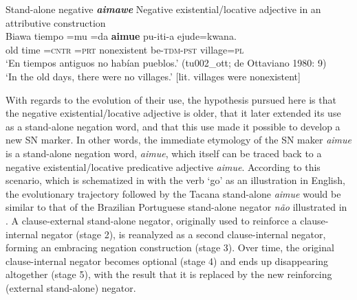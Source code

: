 \documentclass[output=paper]{langsci/langscibook}
\begin{document}
\begin{exe}\ex
\label{ex:tacana-standalone-negative}  Stand-alone negative
\textbf{\textit{aimawe}}
%
\ex\label{ex:tacana-negexadj} Negative existential\slash locative adjective
in an attributive construction\\
\gll {\ob}Biawa tiempo{\cb} =mu =da \textbf{aimue} pu-iti-a ejude=kwana.\\
    old  time  =\textsc{cntr}  \textsc{=prt}  nonexistent
    be-\textsc{tdm-pst}  village=\textsc{pl}\\
\glt `En tiempos antiguos no habían pueblos.' (tu002\_ott; de Ottaviano 1980: 9)\\
`In the old days, there were no villages.' [lit. villages were nonexistent]
\end{exe}

With regards to the evolution of their use, the hypothesis pursued
here is that the negative existential\slash locative adjective is older,
that it later extended its use as a stand-alone negation word, and that
this use made it possible to develop a new SN marker. In other words, the
immediate etymology of the SN maker \textit{aimue} is a stand-alone
negation word, \textit{aimue}, which itself can be traced back to a
negative existential\slash locative predicative adjective \textit{aimue}.
According to this scenario, which is schematized in
 with the verb `go' as an illustration in
English, the evolutionary trajectory followed by the Tacana stand-alone
\textit{aimue} would be similar to that of the Brazilian
Portuguese
stand-alone negator \textit{não} illustrated in .
A clause-external stand-alone negator, originally used to reinforce a
clause-internal negator (stage 2), is reanalyzed as a second
clause-internal negator, forming an embracing negation construction (stage
3). Over time, the original clause-internal negator becomes optional (stage
4) and ends up disappearing altogether (stage 5), with the result that it
is replaced by the new reinforcing (external stand-alone)
negator.
\end{document}
